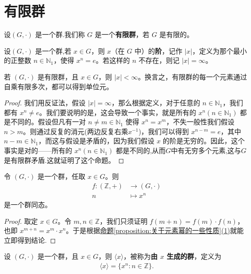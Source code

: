 \documentclass[../../main.tex]{subfiles}
\begin{document}
\section{有限群}

\begin{definition}[有限群]
设$(G,\cdot)$ 是一个群.我们称 $G$ 是一个\textbf{有限群}，若 $G$ 是有限的。 
\end{definition}

\begin{definition}[元素的阶]
设$(G,\cdot)$ 是一个群,若 $x\in G$，则 $x$（在 $G$ 中）的\textbf{阶}，记作 $|x|$，定义为那个最小的正整数 $n\in\mathbb{N}_1$，使得 $x^n = e$。若这样的 $n$ 不存在，则记 $|x|=\infty$。 
\end{definition}

\begin{proposition}[有限群的每个元素的阶必有限]\label{proposition:有限群的每个元素的阶必有限}
若 $(G,\cdot)$ 是有限群，且 $x\in G$，则 $|x|<\infty$。换言之，有限群的每一个元素通过自乘有限多次，都可以得到单位元。
\end{proposition}
\begin{proof}
我们用反证法，假设 $|x|=\infty$，那么根据定义，对于任意的 $n\in\mathbb{N}_1$，我们都有 $x^n\neq e$。我们要说明的是，这会导致一个事实，就是所有的 $x^n(n\in\mathbb{N}_1)$ 都是不同的。假设但凡有一对 $n\neq m\in\mathbb{N}_1$ 使得 $x^n = x^m$，不失一般性我们假设 $n>m$。则通过反复的消元(两边反复右乘$x^{-1}$)，我们可以得到 $x^{n - m}=e$，其中 $n - m\in\mathbb{N}_1$，而这与假设是矛盾的，因为我们假设 $x$ 的阶是无穷的。因此，这个事实是对的——所有的 $x^n(n\in\mathbb{N}_1)$ 都是不同的,从而$G$中有无穷多个元素,这与$G$是有限群矛盾.这就证明了这个命题。 
\end{proof}

\begin{proposition}\label{proposition:关于幂的群同态}
令 $(G,\cdot)$ 是一个群，任取 $x\in G$。则
\begin{align*}
f:(\mathbb{Z} ,+)&\rightarrow (G,\cdot )
\\
n&\mapsto x^n
\end{align*}
是一个群同态。
\end{proposition}
\begin{proof}
取定 $x\in G$。令 $m,n\in\mathbb{Z}$，我们只须证明 $f(m + n)=f(m)\cdot f(n)$，也即 $x^{m + n}=x^m\cdot x^n$。于是根据\hyperref[proposition:关于元素幂的一些性质]{命题\ref{proposition:关于元素幂的一些性质}(1)}就能立即得到结论.
\end{proof}

\begin{definition}[由 $x$ 生成的群]
设 $(G,\cdot)$ 是一个群，且 $x\in G$，则 $\langle x\rangle$，被称为\textbf{由 $x$ 生成的群}，定义为
\begin{align*}
\langle x\rangle=\{x^n:n\in\mathbb{Z}\}.
\end{align*} 
\end{definition}
\end{document}
